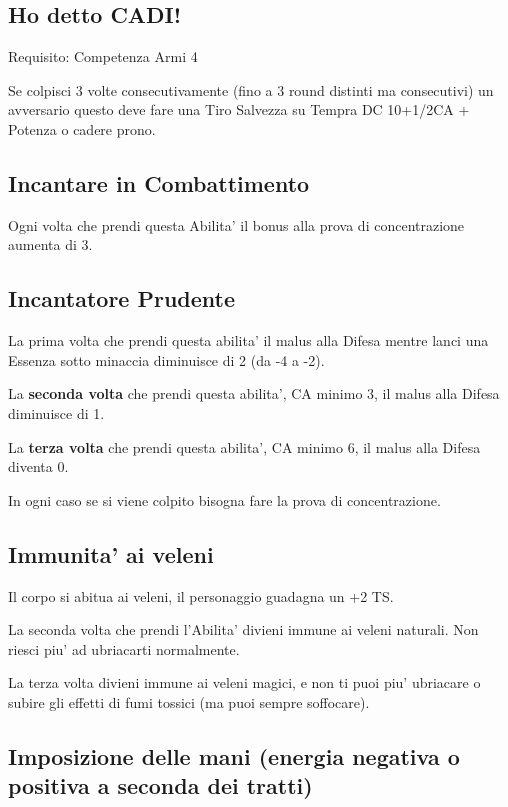 \documentclass[a4paper,11pt,twoside,openany]{dndbook}
\begin{document}
\subsection{Ho detto CADI!}

Requisito: Competenza Armi 4

Se colpisci 3 volte consecutivamente (fino a 3 round distinti ma consecutivi) un avversario questo deve fare una Tiro Salvezza su Tempra DC 10+1/2CA + Potenza o cadere prono.

\subsection{Incantare in Combattimento}

Ogni volta che prendi questa Abilita' il bonus alla prova di concentrazione aumenta di 3.

\subsection{Incantatore Prudente}

La prima volta che prendi questa abilita' il malus alla Difesa mentre lanci una Essenza sotto minaccia diminuisce di 2 (da -4 a -2).

La \textbf{seconda volta} che prendi questa abilita', CA minimo 3, il malus alla Difesa diminuisce di 1.

La \textbf{terza volta} che prendi questa abilita', CA minimo 6, il malus alla Difesa diventa 0.

In ogni caso se si viene colpito bisogna fare la prova di concentrazione.

\subsection{Immunita' ai veleni}

Il corpo si abitua ai veleni, il personaggio guadagna un +2 TS.

La seconda volta che prendi l'Abilita' divieni immune ai veleni naturali.
Non riesci piu' ad ubriacarti normalmente.

La terza volta divieni immune ai veleni magici, e non ti puoi piu' ubriacare o subire gli effetti di fumi tossici (ma puoi sempre soffocare).

\subsection{Imposizione delle mani (energia negativa o positiva a seconda dei tratti)}
\end{document}
